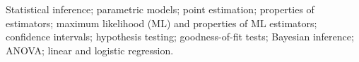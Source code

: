 Statistical inference; 
parametric models; 
point estimation; 
properties of estimators; 
maximum likelihood (ML) and properties of ML estimators; 
confidence intervals; 
hypothesis testing; 
goodness-of-fit tests; 
Bayesian inference; 
ANOVA;
linear and logistic regression.
